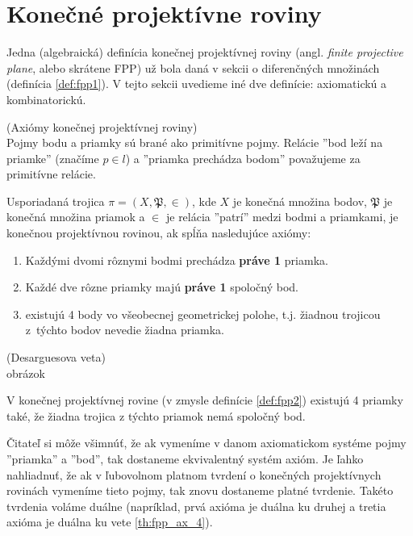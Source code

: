 \section{Konečné projektívne roviny}

Jedna (algebraická) definícia konečnej projektívnej roviny (angl. \emph{finite projective plane}, alebo skrátene FPP) 
už bola daná v sekcii o diferenčných množinách (definícia \ref{def:fpp1}). V tejto sekcii uvedieme iné dve definície: 
axiomatickú a kombinatorickú.


\begin{definition}{(Axiómy konečnej projektívnej roviny)}\\
\label{def:fpp2}
Pojmy bodu a priamky sú brané ako primitívne pojmy. 
Relácie ''bod leží na priamke'' (značíme $p \in l$) a ''priamka prechádza bodom'' považujeme za primitívne relácie.

Usporiadaná trojica $\pi = (X, \mathfrak{P}, \in)$, kde $X$ je konečná množina bodov, $\mathfrak{P}$ je konečná množina priamok
a $\in$ je relácia ''patrí'' medzi bodmi a priamkami, je konečnou projektívnou rovinou, ak spĺňa nasledujúce axiómy:

\begin{enumerate}
    \item Každými dvomi rôznymi bodmi prechádza \textbf{práve 1} priamka.
    \item Každé dve rôzne priamky majú \textbf{práve 1} spoločný bod.
    \item existujú 4 body vo všeobecnej geometrickej polohe, t.j. žiadnou trojicou
    z~týchto bodov nevedie žiadna priamka.
\end{enumerate}
\end{definition}


\begin{theorem_hard}{(Desarguesova veta)}\\
\TODO obrázok
\end{theorem_hard}


\begin{theorem}
\label{th:fpp_ax_4}
V konečnej projektívnej rovine (v zmysle definície \ref{def:fpp2}) existujú 4 priamky také,
že žiadna trojica z týchto priamok nemá spoločný bod.
\end{theorem}

Čitateľ si môže všimnúť, že ak vymeníme v danom axiomatickom systéme pojmy ''priamka'' a ''bod'',
tak dostaneme ekvivalentný systém axióm. Je ľahko nahliadnuť, 
že ak v ľubovolnom platnom tvrdení o konečných projektívnych rovinách vymeníme tieto pojmy, tak
znovu dostaneme platné tvrdenie. Takéto tvrdenia voláme duálne (napríklad, prvá axióma je duálna ku druhej a tretia axióma
je duálna ku vete \ref{th:fpp_ax_4}).

